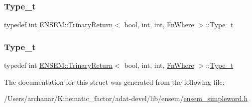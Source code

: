\mbox{\label{structENSEM_1_1TrinaryReturn_3_01bool_00_01int_00_01int_00_01FnWhere_01_4_a903989cc198f060fec5777b5c3b18657}} 
\subsubsection{\texorpdfstring{Type\_t}{Type\_t}\hspace{0.1cm}{\footnotesize\ttfamily [2/3]}}
{\footnotesize\ttfamily typedef int \mbox{\hyperlink{structENSEM_1_1TrinaryReturn}{E\+N\+S\+E\+M\+::\+Trinary\+Return}}$<$ bool, int, int, \mbox{\hyperlink{structENSEM_1_1FnWhere}{Fn\+Where}} $>$\+::\mbox{\hyperlink{structENSEM_1_1TrinaryReturn_3_01bool_00_01int_00_01int_00_01FnWhere_01_4_a903989cc198f060fec5777b5c3b18657}{Type\+\_\+t}}}

\mbox{\label{structENSEM_1_1TrinaryReturn_3_01bool_00_01int_00_01int_00_01FnWhere_01_4_a903989cc198f060fec5777b5c3b18657}} 
\subsubsection{\texorpdfstring{Type\_t}{Type\_t}\hspace{0.1cm}{\footnotesize\ttfamily [3/3]}}
{\footnotesize\ttfamily typedef int \mbox{\hyperlink{structENSEM_1_1TrinaryReturn}{E\+N\+S\+E\+M\+::\+Trinary\+Return}}$<$ bool, int, int, \mbox{\hyperlink{structENSEM_1_1FnWhere}{Fn\+Where}} $>$\+::\mbox{\hyperlink{structENSEM_1_1TrinaryReturn_3_01bool_00_01int_00_01int_00_01FnWhere_01_4_a903989cc198f060fec5777b5c3b18657}{Type\+\_\+t}}}



The documentation for this struct was generated from the following file\+:\begin{DoxyCompactItemize}
\item 
/\+Users/archanar/\+Kinematic\+\_\+factor/adat-\/devel/lib/ensem/\mbox{\hyperlink{adat-devel_2lib_2ensem_2ensem__simpleword_8h}{ensem\+\_\+simpleword.\+h}}\end{DoxyCompactItemize}
